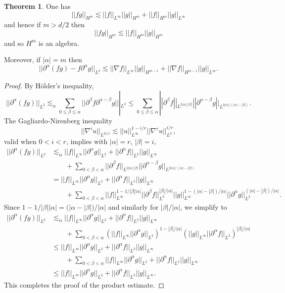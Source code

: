 \documentclass[12pt]{book}
\theoremstyle{definition}
\newtheorem{theorem}{Theorem}[chapter]
\begin{document}
\begin{theorem}
One has
$$||fg||_{H^m} \lesssim ||f||_{L^\infty} ||g||_{H^m} + ||f||_{H^m} ||g||_{L^\infty}$$
and hence if $m > d/2$ then
$$||fg||_{H^m} \lesssim ||f||_{H^m} ||g||_{H^m}$$
and so $H^m$ is an algebra.

Moreover, if $|\alpha| = m$ then
$$||\partial^\alpha(fg) - f\partial^\alpha g||_{L^2} \lesssim ||\nabla f||_{L^\infty} ||g||_{H^{m-1}} + ||\nabla f||_{H^{m-1}} ||g||_{L^\infty}.$$
\end{theorem}
\begin{proof}
By H\"older's inequality,
$$||\partial^\alpha(fg)||_{L^2} \lesssim_\alpha \sum_{0 \leq \beta \leq \alpha} ||\partial^\beta f \partial^{\alpha - \beta} g|||_{L^2}
\leq \sum_{0 \leq \beta \leq \alpha} ||\partial^\beta f||_{L^{2|\alpha|/|\beta|}} ||\partial^{\alpha - \beta} g||_{L^{2|\alpha|/(|\alpha| - |\beta|)}}.$$
The Gagliardo-Nirenberg inequality
$$||\nabla^i u||_{L^{2r/i}} \lesssim ||u||_{L^\infty}^{1-i/r} ||\nabla^r u||_{L^2}^{i/r},$$
valid when $0 < i < r$, implies with $|\alpha| = r$, $|\beta| = i$,
\begin{align*}
||\partial^\alpha(fg)||_{L^2}
&\lesssim_\alpha ||f||_{L^\infty} ||\partial^\alpha g||_{L^2} + ||\partial^\alpha f||_{L^2} ||g||_{L^\infty} \\
&\qquad+ \sum_{0 < \beta < \alpha} ||\partial^\beta f||_{L^{2|\alpha|/|\beta|}} ||\partial^{\alpha - \beta} g||_{L^{2|\alpha|/(|\alpha| - |\beta|)}}\\
&=  ||f||_{L^\infty} ||\partial^\alpha g||_{L^2} + ||\partial^\alpha f||_{L^2} ||g||_{L^\infty} \\
&\qquad+
\sum_{0 < \beta < \alpha} ||f||_{L^\infty}^{1-1/|\beta||\alpha|} ||\partial^\beta f||_{L^2}^{|\beta|/|\alpha|} ||g||_{L^\infty}^{1-(|\alpha| - |\beta|)/|\alpha|} ||\partial^\alpha g||_{L^2}^{(|\alpha| - |\beta|)/|\alpha|}.
\end{align*}
Since $1 - 1/|\beta||\alpha| = (|\alpha - |\beta|)/|\alpha|$ and similarly for $|\beta|/|\alpha|$, we simplify to
\begin{align*}
||\partial^\alpha(fg)||_{L^2}
&\lesssim_\alpha ||f||_{L^\infty} ||\partial^\alpha g||_{L^2} + ||\partial^\alpha f||_{L^2} ||g||_{L^\infty}\\
&\qquad+ \sum_{0 < \beta < \alpha} (||f||_{L^\infty} ||\partial^\alpha g||_{L^2})^{1-|\beta|/|\alpha|} (||g||_{L^\infty} ||\partial^\alpha f||_{L^2})^{|\beta|/|\alpha|}\\
&\leq ||f||_{L^\infty} ||\partial^\alpha g||_{L^2} + ||\partial^\alpha f||_{L^2} ||g||_{L^\infty}\\
&\qquad+\sum_{0 < \beta < \alpha} ||f||_{L^\infty} ||\partial^\alpha g||_{L^2} + ||\partial^\alpha f||_{L^2} ||g||_{L^\infty}\\
&\leq ||f||_{L^\infty} ||\partial^\alpha g||_{L^2} + ||\partial^\alpha f||_{L^2} ||g||_{L^\infty}.
\end{align*}
This completes the proof of the product estimate.


\end{proof}
\end{document}
